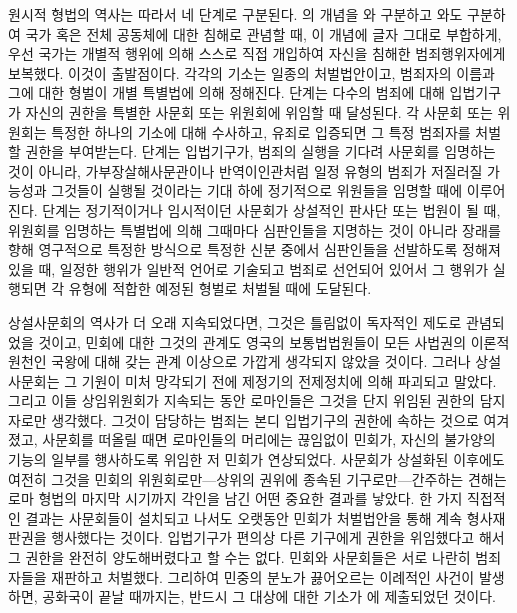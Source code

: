원시적 형법의 역사는 따라서 네 단계로 구분된다.
의 개념을
와 구분하고
와도 구분하여
국가 혹은 전체 공동체에 대한 침해로 관념할 때,
이 개념에 글자 그대로 부합하게,
우선
국가는
개별적 행위에 의해 스스로 직접 개입하여
자신을 침해한 범죄행위자에게 보복했다.
이것이 출발점이다.
각각의 기소는 일종의 처벌법안이고,
범죄자의 이름과 그에 대한 형벌이 개별 특별법에 의해 정해진다.
 단계는
다수의 범죄에 대해
입법기구가 자신의 권한을 특별한 사문회 또는 위원회에 위임할 때
달성된다.
각 사문회 또는 위원회는
특정한 하나의 기소에 대해 수사하고,
유죄로 입증되면 그 특정 범죄자를 처벌할 권한을 부여받는다.
 단계는
입법기구가,
범죄의 실행을 기다려
사문회를 임명하는 것이 아니라,
가부장살해사문관이나 반역이인관처럼
일정 유형의 범죄가 저질러질 가능성과
 그것들이 실행될 것이라는 기대 하에
정기적으로 위원들을 임명할 때에 이루어진다.
 단계는
정기적이거나 임시적이던 사문회가
상설적인 판사단 또는 법원이 될 때,
위원회를 임명하는 특별법에 의해 그때마다
심판인들을
지명하는 것이 아니라
장래를 향해 영구적으로
특정한 방식으로 특정한 신분 중에서
심판인들을
선발하도록 정해져있을 때,
일정한 행위가 일반적 언어로 기술되고 범죄로 선언되어 있어서
그 행위가 실행되면 각 유형에 적합한 예정된 형벌로 처벌될 때에
도달된다.

상설사문회의 역사가 더 오래 지속되었다면,
그것은 틀림없이 독자적인 제도로 관념되었을 것이고,
민회에 대한 그것의 관계도
영국의 보통법법원들이
모든 사법권의 이론적 원천인
국왕에 대해 갖는 관계 이상으로
가깝게 생각되지 않았을 것이다.
그러나
상설사문회는 그 기원이 미처 망각되기 전에
제정기의 전제정치에 의해
파괴되고 말았다.
그리고 이들 상임위원회가 지속되는 동안
로마인들은
그것을 단지 위임된 권한의 담지자로만 생각했다.
그것이 담당하는 범죄는 본디 입법기구의 권한에 속하는 것으로 여겨졌고,
사문회를 떠올릴 때면
로마인들의 머리에는
끊임없이 민회가,
자신의 불가양의 기능의 일부를 행사하도록 위임한 저 민회가
연상되었다.
사문회가
상설화된 이후에도 여전히
그것을 민회의 위원회로만---상위의 권위에 종속된 기구로만---간주하는 견해는
로마 형법의 마지막 시기까지 각인을 남긴 어떤 중요한 결과를 낳았다.
한 가지 직접적인 결과는
사문회들이 설치되고 나서도 오랫동안
민회가
처벌법안을 통해
계속
형사재판권을 행사했다는 것이다.
입법기구가 편의상 다른 기구에게 권한을 위임했다고 해서
그 권한을 완전히 양도해버렸다고 할 수는 없다.
민회와 사문회들은 서로 나란히 범죄자들을 재판하고 처벌했다.
그리하여
민중의 분노가 끓어오르는 이례적인 사건이 발생하면,
공화국이 끝날 때까지는,
반드시 그 대상에 대한 기소가
에 제출되었던 것이다.

